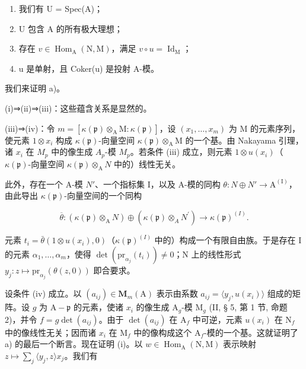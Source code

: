 \begin{enumerate}
\def\labelenumi{(\roman{enumi})}
\item
  我们有 U = Spec(A)；
\item
  U 包含 A 的所有极大理想；
\item
  存在 \(v \in \operatorname{Hom}_{\mathrm{A}}(\mathrm{N}, \mathrm{M})\)，满足 \(v \circ u = \operatorname{Id}_{\mathrm{M}}\)；
\item
  u 是单射，且 Coker(u) 是投射 A-模。
\end{enumerate}

我们来证明 a)。

(i)⇒(ii)⇒(iii)：这些蕴含关系是显然的。

(iii)⇒(iv)：令 \(m = [\kappa(\mathfrak{p}) \otimes_{\mathrm{A}} \mathrm{M} : \kappa(\mathfrak{p})]\)，设 \((x_{1}, \ldots, x_{m})\) 为 M 的元素序列，使元素 \(1 \otimes x_{i}\) 构成 \(\kappa(\mathfrak{p})\)-向量空间 \(\kappa(\mathfrak{p}) \otimes_{\mathrm{A}} \mathrm{M}\) 的一个基。由 Nakayama 引理，诸 \(x_{i}\) 在 \(M_{p}\) 中的像生成 \(A_{p}\)-模 \(M_{p}\)。若条件 (iii) 成立，则元素 \(1 \otimes u(x_{i})\)（\(\kappa(\mathfrak{p})\)-向量空间 \(\kappa(\mathfrak{p}) \otimes_{\mathrm{A}} N\) 中的）线性无关。

此外，存在一个 A-模 \(N'\)、一个指标集 I，以及 A-模的同构 \(\theta : N \oplus N' \to \mathrm{A}^{(\mathrm{I})}\)，由此导出 \(\kappa(\mathfrak{p})\)-向量空间的一个同构

\[
\overline {{{\theta}}}: (\kappa (\mathfrak {p}) \otimes_ {\mathrm{A}} N) \oplus (\kappa (\mathfrak {p}) \otimes_ {A} N ^ {\prime}) \rightarrow \kappa (\mathfrak {p}) ^ {(I)}.
\]

元素 \(t_i = \bar{\theta}(1 \otimes u(x_i), 0)\)（\(\kappa(\mathfrak{p})^{(I)}\) 中的）构成一个有限自由族。于是存在 I 的元素 \(\alpha_1, \ldots, \alpha_{m}\)，使得 \(\det(\mathrm{pr}_{\alpha_j}(t_i)) \neq 0\)；N 上的线性形式 \(y_j : z \mapsto \mathrm{pr}_{\alpha_j}(\theta(z, 0))\) 即合要求。

设条件 (iv) 成立。以 \((a_{ij}) \in \mathbf{M}_m(\mathrm{A})\) 表示由系数 \(a_{ij} = \langle y_j, u(x_i)\rangle\) 组成的矩阵。设 \(g\) 为 \(\mathrm{A} - \mathfrak{p}\) 的元素，使诸 \(x_i\) 的像生成 \(\mathrm{A}_g\)-模 \(\mathrm{M}_g\) (II, § 5, 第 1 节, 命题 2)，并令 \(f = g \det(a_{ij})\)。由于 \(\det(a_{ij})\) 在 \(\mathrm{A}_f\) 中可逆，元素 \(u(x_i)\) 在 \(\mathrm{N}_f\) 中的像线性无关；因而诸 \(x_i\) 在 \(\mathrm{M}_f\) 中的像构成这个 \(\mathrm{A}_f\)-模的一个基。这就证明了 a) 的最后一个断言。现在证明 (i)。以 \(w \in \operatorname{Hom}_{\mathrm{A}}(\mathrm{N}, \mathrm{M})\) 表示映射 \(z \mapsto \sum_{j} \langle y_j, z\rangle x_j\)。我们有

